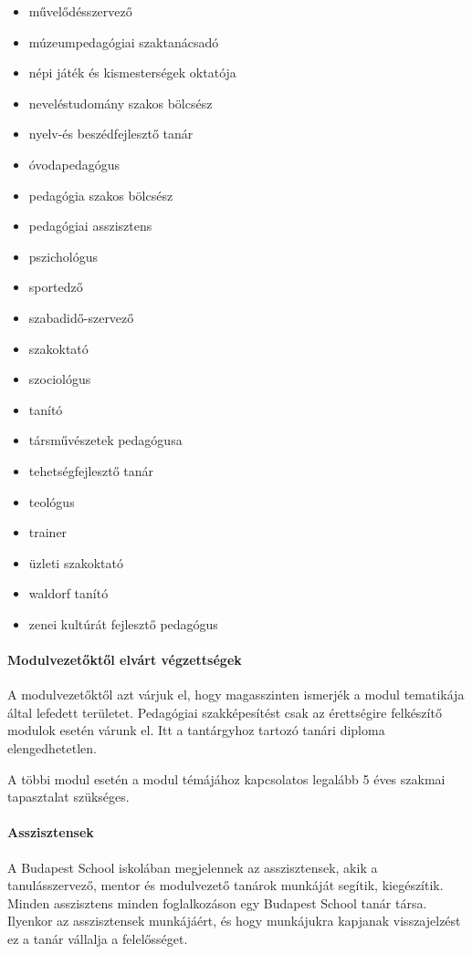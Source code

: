 \begin{itemize}
\item művelődésszervező
\item múzeumpedagógiai szaktanácsadó
\item népi játék és kismesterségek oktatója
\item neveléstudomány szakos bölcsész
\item nyelv-és beszédfejlesztő tanár
\item óvodapedagógus
\item pedagógia szakos bölcsész
\item pedagógiai asszisztens
\item pszichológus
\item sportedző
\item szabadidő-szervező
\item szakoktató
\item szociológus
\item tanító
\item társművészetek pedagógusa
\item tehetségfejlesztő tanár
\item teológus
\item trainer
\item üzleti szakoktató
\item waldorf tanító
\item zenei kultúrát fejlesztő pedagógus
\end{itemize}

\paragraph{Modulvezetőktől elvárt végzettségek}
A modulvezetőktől azt várjuk el, hogy magasszinten ismerjék a modul tematikája által lefedett területet. Pedagógiai szakképesítést csak az érettségire felkészítő modulok esetén várunk el. Itt a tantárgyhoz tartozó tanári diploma elengedhetetlen.

A többi modul esetén a modul témájához kapcsolatos legalább 5 éves szakmai tapasztalat szükséges.

\paragraph{Asszisztensek}
A Budapest School iskolában megjelennek az asszisztensek, akik a tanulásszervező, mentor és modulvezető tanárok munkáját segítik, kiegészítik. Minden asszisztens minden foglalkozáson egy Budapest School tanár társa. Ilyenkor az asszisztensek munkájáért, és hogy munkájukra kapjanak visszajelzést ez a tanár vállalja a felelősséget.



